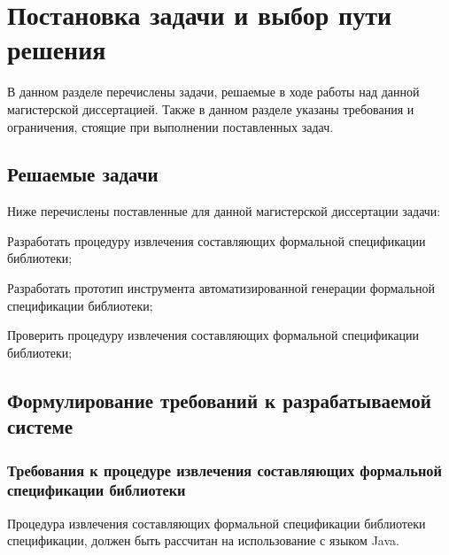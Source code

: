 \chapter{Постановка задачи и выбор пути решения}

В данном разделе перечислены задачи, решаемые в ходе работы над данной магистерской диссертацией. Также в данном разделе указаны требования и ограничения, стоящие при выполнении поставленных задач.

\section{Решаемые задачи}

Ниже перечислены поставленные для данной магистерской диссертации задачи:
%
\begin{itemize*}
\item Разработать процедуру извлечения составляющих формальной спецификации библиотеки;
\item Разработать прототип инструмента автоматизированной генерации формальной спецификации библиотеки;
\item Проверить процедуру извлечения составляющих формальной спецификации библиотеки;
\end{itemize*}
%

\section{Формулирование требований к разрабатываемой системе}

\subsection{Требования к процедуре извлечения составляющих формальной спецификации библиотеки}

Процедура извлечения составляющих формальной спецификации библиотеки спецификации, должен быть рассчитан на использование с языком Java.

